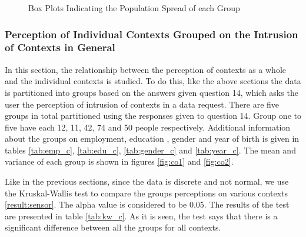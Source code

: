 \begin{figure}[htp]
\caption{Box Plots Indicating the Population Spread of each Group}
\label{fig:st3}
\end{figure}

\subsubsection{Perception of Individual Contexts Grouped on the Intrusion of Contexts in General}

In this section, the relationship between the perception of contexts as a whole and the individual contexts is studied. 
To do this, like the above sections the data is partitioned into groups based on the answers given question 14, which asks the user the perception of intrusion of contexts in a data request. There are five groups in total partitioned using the responses given to question 14. Group one to five have each 12, 11, 42, 74 and 50 people respectively. Additional
information about the groups on employment, education , gender and year of birth is given in tables \ref{tab:emp_c}, \ref{tab:edu_c}, \ref{tab:gender_c} and \ref{tab:year_c}. The mean and variance of each group is shown in figures \ref{fig:co1} and \ref{fig:co2}.

Like in the previous sections, since the data is discrete and not normal, we use the Kruskal-Wallis test to compare the groups perceptions on various contexts \ref{result:sensor}. The alpha value is considered to be 0.05. The results of the test are presented in table \ref{tab:kw_c}. As it is seen, the test says that there is a significant difference between all the groups for all contexts.

